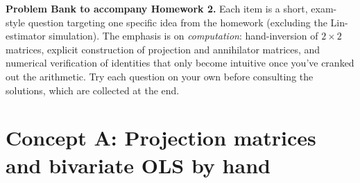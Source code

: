 \documentclass{article}
\begin{document}
\noindent\textbf{Problem Bank to accompany Homework 2.}  Each item is a short, exam-style question targeting one specific idea from the homework (excluding the Lin-estimator simulation).  The emphasis is on \emph{computation}: hand-inversion of $2\times 2$ matrices, explicit construction of projection and annihilator matrices, and numerical verification of identities that only become intuitive once you've cranked out the arithmetic.  Try each question on your own before consulting the solutions, which are collected at the end.

\bigskip

\section*{Concept A: Projection matrices and bivariate OLS by hand}
\end{document}
